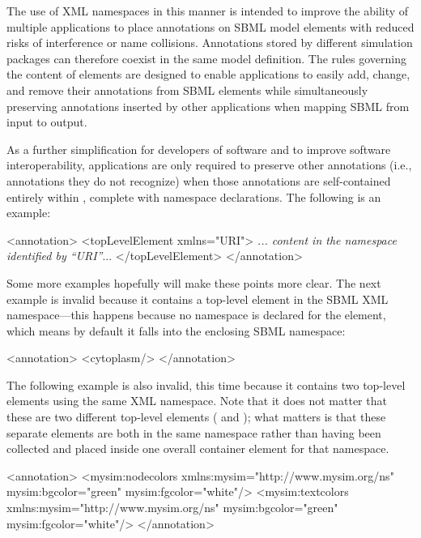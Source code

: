 The use of XML namespaces in this manner is intended to improve
the ability of multiple applications to place annotations on SBML
model elements with reduced risks of interference or name
collisions.  Annotations stored by different simulation packages
can therefore coexist in the same model definition.  The rules
governing the content of  elements are designed
to enable applications to easily add, change, and remove their
annotations from SBML elements while simultaneously preserving
annotations inserted by other applications when mapping SBML from
input to output.

As a further simplification for developers of software and to
improve software interoperability, applications are only required
to preserve other annotations (i.e., annotations they do not
recognize) when those annotations are self-contained entirely
within , complete with namespace declarations.
The following is an example:

\begin{example}
<annotation>
    <topLevelElement xmlns="URI">
       \textrm{\emph{... content in the namespace identified by \textquotedblleft{}URI\textquotedblright}...}
    </topLevelElement>
</annotation>
\end{example}

Some more examples hopefully will make these points more clear.  The next
example is invalid because it contains a top-level element in the
SBML XML namespace---this happens because no namespace is declared
for the  element, which means by default it
falls into the enclosing SBML namespace:

\begin{example}
<annotation>
    <cytoplasm/>
</annotation>
\end{example}

The following example is also invalid, this
  time because it contains two top-level elements using the same
XML namespace.  Note that it does not matter that these are two
different top-level elements ( and
); what matters is that these separate
elements are both in the same namespace rather than having been
collected and placed inside one overall container element for that
namespace.

\begin{example}
<annotation>
    <mysim:nodecolors xmlns:mysim="http://www.mysim.org/ns"
        mysim:bgcolor="green" mysim:fgcolor="white"/>
    <mysim:textcolors xmlns:mysim="http://www.mysim.org/ns"
        mysim:bgcolor="green" mysim:fgcolor="white"/>
</annotation>
\end{example}

